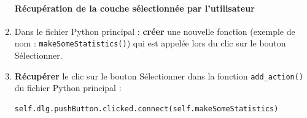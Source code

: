 \documentclass[11pt]{article}
\begin{document}
\begin{enumerate}
\paragraph*{Récupération de la couche sélectionnée par l'utilisateur}

\item Dans le fichier Python principal : \textbf{créer} une nouvelle fonction (exemple de nom : \og{}\texttt{makeSomeStatistics()}\fg{}) qui est appelée lors du clic sur le bouton \og{}Sélectionner\fg{}.

\item \textbf{Récupérer} le clic sur le bouton \og{}Sélectionner\fg{} dans la fonction \og{}\texttt{add\_action()}\fg{} du fichier Python principal : 
\vspace*{-1em}
\begin{center}
\begin{minipage}[t]{0.70\textwidth}
\begin{verbatim}
self.dlg.pushButton.clicked.connect(self.makeSomeStatistics)
\end{verbatim}
\end{minipage}
\end{center}
\vspace*{0.4em}


\end{enumerate}
\end{document}
